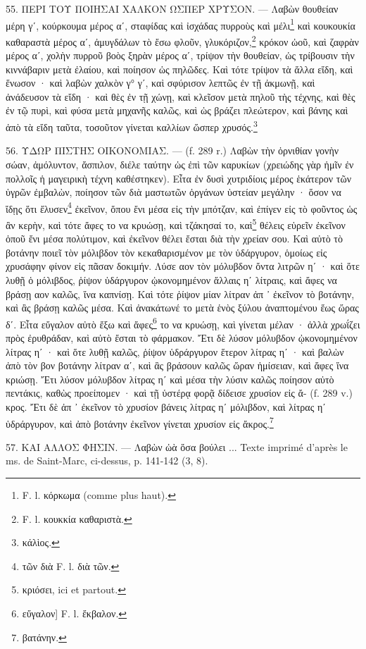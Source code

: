 \documentclass[a4paper, 11pt, oneside, polutonikogreek, french]{article}
\begin{document}
55. ΠΕΡΙ ΤΟΥ ΠΟΙΗΣΑΙ ΧΑΛΚΟΝ ΩΣΠΕΡ ΧΡΥΣΟΝ. --- Λαβὼν θουθείαν μέρη γʹ, κούρκουμα μέρος αʹ, σταφίδας καὶ ἰσχάδας πυρροὺς καὶ μέλι\footnote{F. l. κόρκωμα (comme plus haut).} καὶ κουκουκία καθαραστὰ μέρος αʹ, ἀμυγδάλων τὸ ἔσω φλοῦν, γλυκόριζον,\footnote{F. l. κουκκία καθαριστὰ.} κρόκον ὠοῦ, καὶ ζαφρὰν μέρος αʹ, χολὴν πυρροῦ βοὸς ξηρὰν μέρος αʹ, τρίψον τὴν θουθείαν, ὡς τρίβουσιν τὴν κιννάβαριν μετὰ ἐλαίου, καὶ ποίησον ὡς πηλῶδες. Καὶ τότε τρίψον τὰ ἄλλα εἴδη, καὶ ἕνωσον · καὶ λαβὼν χαλκὸν γ° γʹ, καὶ σφύρισον λεπτῶς ἐν τῇ ἀκμωνῇ, καὶ ἀνάδευσον τὰ εἴδη · καὶ θὲς ἐν τῇ χώνῃ, καὶ κλεῖσον μετὰ πηλοῦ τὴς τέχνης, καὶ θὲς ἐν τῷ πυρὶ, καὶ φύσα μετὰ μηχανῆς καλῶς, καὶ ὡς βράζει πλεώτερον, καὶ βάνης καὶ ἀπὸ τὰ εἴδη ταῦτα, τοσοῦτον γίνεται καλλίων ὥσπερ χρυσός.\footnote{κάλὶος.}

56. ΥΔΩΡ ΠΙΣΤΗΣ ΟΙΚΟΝΟΜΙΑΣ. --- (f. 289 r.) Λαβὼν τὴν ὀρνιθίαν γονὴν σώαν, ἀμόλυντον, ἄσπιλον, διέλε ταύτην ὡς ἐπὶ τῶν καρυκίων (χρειώδης γὰρ ἡμῖν ἐν πολλοῖς ἡ μαγειρικὴ τέχνη καθέστηκεν). Εἶτα ἐν δυσὶ χυτριδίοις μέρος ἑκάτερον τῶν ὑγρῶν ἐμβαλὼν, ποίησον τῶν διὰ μαστωτῶν ὀργάνων ὑστείαν μεγάλην · ὅσον να ἴδῃς ὅτι ἔλυσεν\footnote{τῶν διὰ F. l. διὰ τῶν.} ἐκεῖνον, ὅπου ἔνι μέσα εἰς τὴν μπότζαν, καὶ ἐπίγεν εἰς τὸ φοῦντος ὡς ἂν κερὴν, καὶ τότε ἄφες το να κρυώσῃ, καὶ τζάκησαί το, καὶ\footnote{κριόσει, ici et partout.} θέλεις εὑρεῖν ἐκεῖνον ὁποῦ ἔνι μέσα πολύτιμον, καὶ ἐκεῖνον θέλει ἔσται διὰ τὴν χρείαν σου. Καὶ αὐτὸ τὸ βοτάνην ποιεῖ τὸν μόλιβδον τὸν κεκαθαρισμένον με τὸν ὑδάργυρον, ὁμοίως εἰς χρυσάφην φίνον εἰς πᾶσαν δοκιμήν. Λύσε αον τὸν μόλυβδον ὄντα λιτρῶν ηʹ · καὶ ὅτε λυθῇ ὁ μόλιβδος, ῥίψον ὑδάργυρον ᾠκονομημένον ἄλλαις ηʹ λίτραις, καὶ ἄφες να βράσῃ αον καλῶς, ἵνα καπνίσῃ. Καὶ τότε ῥίψον μίαν λίτραν ἀπ ᾽ ἐκεῖνον τὸ βοτάνην, καὶ ἂς βράσῃ καλῶς μέσα. Καὶ ἀνακάτωνέ το μετὰ ἑνὸς ξύλου ἀναπτομένου ἕως ὥρας δʹ. Εἶτα εὔγαλον αὐτὸ ἔξω καὶ ἄφες\footnote{εὔγαλον] F. l. ἔκβαλον.} το να κρυώσῃ, καὶ γίνεται μέλαν · ἀλλὰ χρωΐζει πρὸς ἐρυθράδαν, καὶ αὐτὸ ἔσται τὸ φάρμακον. Ἔτι δὲ λύσον μόλυβδον ᾠκονομημένον λίτρας ηʹ · καὶ ὅτε λυθῇ καλῶς, ῥίψον ὑδράργυρον ἕτερον λίτρας ηʹ · καὶ βαλὼν ἀπὸ τὸν βον βοτάνην λίτραν αʹ, καὶ ἂς βράσουν καλῶς ὥραν ἡμίσειαν, καὶ ἄφες ἵνα κριώσῃ. Ἔτι λύσον μόλυβδον λίτρας ηʹ καὶ μέσα τὴν λύσιν καλῶς ποίησον αὐτὸ πεντάκις, καθὼς προείπομεν · καὶ τῇ ὑστέρᾳ φορᾷ δίδεισε χρυσίον εἰς ἄ- (f. 289 v.) κρος. Ἔτι δὲ ἀπ ᾽ ἐκεῖνον τὸ χρυσίον βάνεις λίτρας ηʹ μόλιβδον, καὶ λίτρας ηʹ ὑδράργυρον, καὶ ἀπὸ βοτάνην ἐκεῖνον γίνεται χρυσίον εἰς ἄκρος.\footnote{βατάνην.}

57. ΚΑΙ ΑΛΛΟΣ ΦΗΣΙΝ. --- Λαβὼν ὠὰ ὅσα βούλει ... Texte imprimé d'après le ms. de Saint-Marc, ci-dessus, p. 141-142 (3, 8).
\end{document}
